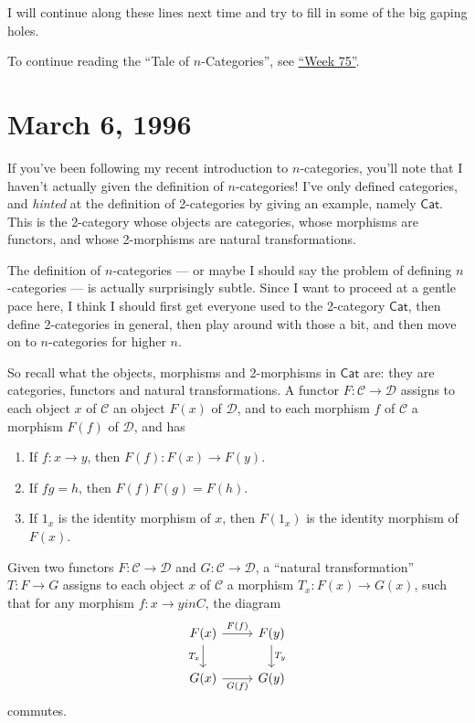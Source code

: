 \documentclass{article}
\def\tightlist{}
\begin{document}
I will continue along these lines next time and try to fill in some of
the big gaping holes.

To continue reading the ``Tale of \(n\)-Categories'', see
\protect\hyperlink{week75}{``Week 75''}.
\hypertarget{week75}{%
\section{March 6, 1996}\label{week75}}

If you've been following my recent introduction to \(n\)-categories,
you'll note that I haven't actually given the definition of
\(n\)-categories! I've only defined categories, and \emph{hinted} at the
definition of 2-categories by giving an example, namely
\(\mathsf{Cat}\). This is the 2-category whose objects are categories,
whose morphisms are functors, and whose 2-morphisms are natural
transformations.

The definition of \(n\)-categories --- or maybe I should say the problem
of defining \(n\)-categories --- is actually surprisingly subtle. Since
I want to proceed at a gentle pace here, I think I should first get
everyone used to the 2-category \(\mathsf{Cat}\), then define
2-categories in general, then play around with those a bit, and then
move on to \(n\)-categories for higher \(n\).

So recall what the objects, morphisms and 2-morphisms in
\(\mathsf{Cat}\) are: they are categories, functors and natural
transformations. A functor \(F\colon \mathcal{C}\to\mathcal{D}\) assigns
to each object \(x\) of \(\mathcal{C}\) an object \(F(x)\) of
\(\mathcal{D}\), and to each morphism \(f\) of \(\mathcal{C}\) a
morphism \(F(f)\) of \(\mathcal{D}\), and has

\begin{enumerate}
\def\labelenumi{\arabic{enumi}.}
\tightlist
\item
  If \(f\colon x \to y\), then \(F(f)\colon F(x) \to F(y)\).
\item
  If \(fg = h\), then \(F(f)F(g) = F(h)\).
\item
  If \(1_x\) is the identity morphism of \(x\), then \(F(1_x)\) is the
  identity morphism of \(F(x)\).
\end{enumerate}

Given two functors \(F\colon\mathcal{C}\to\mathcal{D}\) and
\(G\colon\mathcal{C}\to\mathcal{D}\), a ``natural transformation''
\(T\colon F\to G\) assigns to each object \(x\) of \(\mathcal{C}\) a
morphism \(T_x\colon F(x)\to G(x)\), such that for any morphism
\(f\colon x\to y in C\), the diagram \[
  \begin{tikzcd}
    F(x) \rar["F(f)"] \dar[swap,"T_x"]
    & F(y) \dar["T_y"]
  \\G(x) \rar[swap,"G(f)"]
    & G(y)
  \end{tikzcd}
\] commutes.
\end{document}
